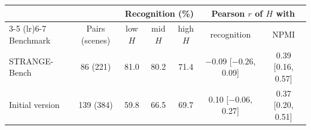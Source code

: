 \begin{tabular}{l c ccc cc}
\toprule
& & \multicolumn{3}{c}{Recognition (\%)} & \multicolumn{2}{c}{Pearson $r$ of $H$ with} \\
\cmidrule(lr){3-5} \cmidrule(lr){6-7}
Benchmark & Pairs (scenes) & low $H$ & mid $H$ & high $H$ & recognition & NPMI \\
\midrule
STRANGE-Bench & 86 (221) & 81.0 & 80.2 & 71.4 & $-0.09$ [$-0.26$, 0.09] & 0.39 [0.16, 0.57] \\
Initial version & 139 (384) & 59.8 & 66.5 & 69.7 & 0.10 [$-0.06$, 0.27] & 0.37 [0.20, 0.51] \\
\bottomrule
\end{tabular}
